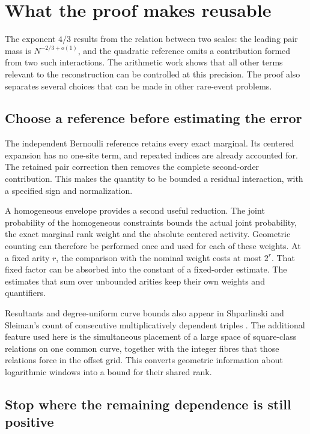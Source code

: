 \section{What the proof makes reusable}
\label{p1:discussion}

The exponent \(4/3\) results from the relation between two scales:
the leading pair mass is \(N^{-2/3+o(1)}\), and the quadratic
reference omits a contribution formed from two such interactions.
The arithmetic work shows that all other terms relevant to the
reconstruction can be controlled at this precision. The proof also
separates several choices that can be made in other rare-event
problems.

\subsection{Choose a reference before estimating the error}

The independent Bernoulli reference retains every exact marginal.
Its centered expansion has no one-site term, and repeated indices
are already accounted for. The retained pair correction then
removes the complete second-order contribution. This makes the
quantity to be bounded a residual interaction, with a specified
sign and normalization.

A homogeneous envelope provides a second useful reduction. The
joint probability of the homogeneous constraints bounds the actual
joint probability, the exact marginal rank weight and the absolute
centered activity. Geometric counting can therefore be performed
once and used for each of these weights. At a fixed arity \(r\),
the comparison with the nominal weight costs at most \(2^r\).
That fixed factor can be absorbed into the constant of a fixed-order
estimate. The estimates that sum over unbounded arities keep their
own weights and quantifiers.

Resultants and degree-uniform curve bounds also appear in Shparlinski
and Sleiman's count of consecutive multiplicatively dependent triples
\cite[Theorem~1.1 and Section~3]{shparlinskisleiman2026}.
The additional feature used here is the simultaneous placement of a
large space of square-class relations on one common curve, together
with the integer fibres that those relations force in the offset grid.
This converts geometric information about logarithmic windows into a
bound for their shared rank.

\subsection{Stop where the remaining dependence is still positive}

